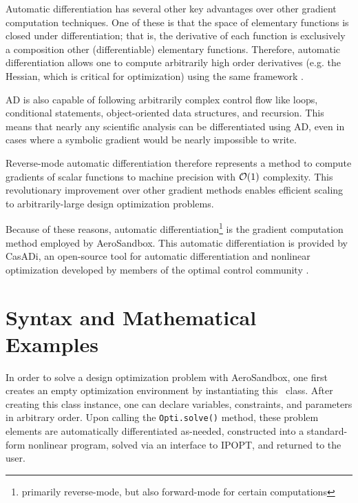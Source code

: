 Automatic differentiation has several other key advantages over other gradient computation techniques. One of these is that the space of elementary functions is closed under differentiation; that is, the derivative of each function is exclusively a composition other (differentiable) elementary functions. Therefore, automatic differentiation allows one to compute arbitrarily high order derivatives (e.g. the Hessian, which is critical for optimization) using the same framework \cite{jax}.

AD is also capable of following arbitrarily complex control flow like loops, conditional statements, object-oriented data structures, and recursion. This means that nearly any scientific analysis can be differentiated using AD, even in cases where a symbolic gradient would be nearly impossible to write.

Reverse-mode automatic differentiation therefore represents a method to compute gradients of scalar functions to machine precision with $\mathcal{O}(1)$ complexity. This revolutionary improvement over other gradient methods enables efficient scaling to arbitrarily-large design optimization problems.

Because of these reasons, automatic differentiation\footnote{primarily reverse-mode, but also forward-mode for certain computations} is the gradient computation method employed by AeroSandbox. This automatic differentiation is provided by CasADi, an open-source tool for automatic differentiation and nonlinear optimization developed by members of the optimal control community \cite{casadi}.

%


\section{Syntax and Mathematical Examples}

In order to solve a design optimization problem with AeroSandbox, one first creates an empty optimization environment by instantiating this \opti\ class. After creating this class instance, one can declare variables, constraints, and parameters in arbitrary order. Upon calling the \texttt{Opti.solve()} method, these problem elements are automatically differentiated as-needed, constructed into a standard-form nonlinear program, solved via an interface to IPOPT, and returned to the user.


